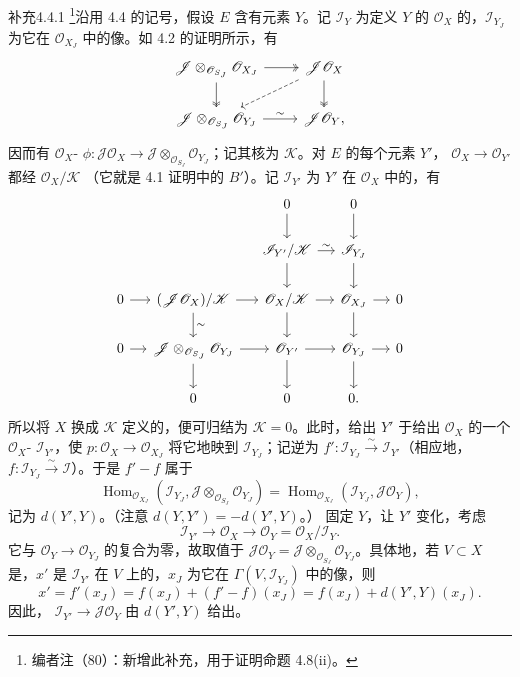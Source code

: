 \begin{SGAresult}{补充}{4.4.1}
\footnote{编者注（80）：新增此补充，用于证明命题 4.8(ii)。}沿用 4.4 的记号，假设 $E$ 含有元素 $Y$。记 $\mathscr I_Y$ 为定义 $Y$ 的 $\mathscr O_X$ 的，$\mathscr I_{Y_J}$ 为它在 $\mathscr O_{X_J}$ 中的像。如 4.2 的证明所示，有
\[
\begin{tikzcd}
\mathscr J\otimes_{\mathscr O_{S_J}}\mathscr O_{X_J}\arrow[r,two heads]\arrow[d,two heads]&\mathscr J\mathscr O_X\arrow[d,two heads]\arrow[dl,dashed]\\
\mathscr J\otimes_{\mathscr O_{S_J}}\mathscr O_{Y_J}\arrow[r,"\sim"]&\mathscr J\mathscr O_Y,
\end{tikzcd}
\]
因而有 $\mathscr O_X$- $\phi:\mathscr J\mathscr O_X\to\mathscr J\otimes_{\mathscr O_{S_J}}\mathscr O_{Y_J}$；记其核为 $\mathscr K$。对 $E$ 的每个元素 $Y'$， $\mathscr O_X\to\mathscr O_{Y'}$ 都经 $\mathscr O_X/\mathscr K$ （它就是 4.1 证明中的 $B'$）。记 $\mathscr I_{Y'}$ 为 $Y'$ 在 $\mathscr O_X$ 中的，有
\[
\begin{tikzcd}[column sep=small]
&&0\arrow[d]&0\arrow[d]\\
&&\mathscr I_{Y'}/\mathscr K\arrow[d]\arrow[r,"\sim"]&\mathscr I_{Y_J}\arrow[d]\\
0\arrow[r]&(\mathscr J\mathscr O_X)/\mathscr K\arrow[r]\arrow[d,"\sim"]&\mathscr O_X/\mathscr K\arrow[r]\arrow[d]&\mathscr O_{X_J}\arrow[r]\arrow[d]&0\\
0\arrow[r]&\mathscr J\otimes_{\mathscr O_{S_J}}\mathscr O_{Y_J}\arrow[r]\arrow[d]&\mathscr O_{Y'}\arrow[r]\arrow[d]&\mathscr O_{Y_J}\arrow[r]\arrow[d]&0\\
&0&0&0.
\end{tikzcd}
\]
所以将 $X$ 换成 $\mathscr K$ 定义的，便可归结为 $\mathscr K=0$。此时，给出 $Y'$ 于给出 $\mathscr O_X$ 的一个 $\mathscr O_X$- $\mathscr I_{Y'}$，使 $p:\mathscr O_X\to\mathscr O_{X_J}$ 将它地映到 $\mathscr I_{Y_J}$；记逆为 $f':\mathscr I_{Y_J}\xrightarrow\sim\mathscr I_{Y'}$（相应地，$f:\mathscr I_{Y_J}\xrightarrow\sim\mathscr I$）。于是 $f'-f$ 属于
\[\operatorname{Hom}_{\mathscr O_{X_J}}(\mathscr I_{Y_J},\mathscr J\otimes_{\mathscr O_{S_J}}\mathscr O_{Y_J})=\operatorname{Hom}_{\mathscr O_{X_J}}(\mathscr I_{Y_J},\mathscr J\mathscr O_Y),\]
记为 $d(Y',Y)$。（注意 $d(Y,Y')=-d(Y',Y)$。）
固定 $Y$，让 $Y'$ 变化，考虑
\[\mathscr I_{Y'}\longrightarrow\mathscr O_X\longrightarrow\mathscr O_Y=\mathscr O_X/\mathscr I_Y.\]
它与 $\mathscr O_Y\to\mathscr O_{Y_J}$ 的复合为零，故取值于 $\mathscr J\mathscr O_Y=\mathscr J\otimes_{\mathscr O_{S_J}}\mathscr O_{Y_J}$。具体地，若 $V\subset X$ 是，$x'$ 是 $\mathscr I_{Y'}$ 在 $V$ 上的，$x_J$ 为它在 $\Gamma(V,\mathscr I_{Y_J})$ 中的像，则
\[x'=f'(x_J)=f(x_J)+(f'-f)(x_J)=f(x_J)+d(Y',Y)(x_J).\]
因此， $\mathscr I_{Y'}\to\mathscr J\mathscr O_Y$ 由 $d(Y',Y)$ 给出。
\end{SGAresult}

